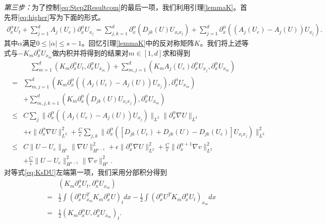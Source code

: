 \documentclass{article}
\begin{document}
\emph{第三步：}为了控制\eqref{eq:Step2Resultcom}的最后一项，我们利用引理\ref{lemmaK}。首先将\eqref{eq:higher}写为下面的形式。
\begin{eqnarray*}
  \partial_x^\alpha  U_t + \sum_{j=1}^d A_j(U_e) \partial_x^\alpha  U_{x_j}
 = \sum_{j,k=1}^d  \partial_x^\alpha ( D_{jk} (U)U_{x_i x_j} ) + \sum_{j=1}^d \partial_x^\alpha ((A_j(U_e) - A_j(U))U_{x_j}).
\end{eqnarray*}
其中$\alpha$满足$0\le|\alpha|\le s-1$。回忆引理\ref{lemmaK}中的反对称矩阵$K$。我们将上述等式与$-K_m\partial_x^\alpha U_{x_m}$做内积并将得到的结果对$m \in [1,d]$求和得到
\begin{eqnarray} \label{eq:KsDU}
  && \quad \sum_{m=1}^d  (K_m \partial_x^\alpha U_t,\partial_x^\alpha U_{x_m}) + \sum_{m,j=1}^d (K_m A_j(U_e) \partial_x^\alpha U_{x_j}, \partial_x^\alpha U_{x_m}) \\
  &=&  \sum_{m,j=1}^d(K_m\partial_x^\alpha ( (A_j(U_e) - A_j(U)) U_{x_j}), \partial_x^\alpha U_{x_m}) \nonumber \\
 && +
  \sum_{m,j,k=1}^d (K_m \partial_x^\alpha (D_{jk} (U) U_{x_i x_j} ),\partial_x^\alpha U_{x_m}) \nonumber \\
 & \le&
  C\sum_j \|\partial_x^\alpha ((A_j(U_e)-A_j(U))U_{x_j})\|_{L^2} \|\partial_x^\alpha \nabla U\|_{L^2} \nonumber \\
  && + \epsilon \|\partial_x^\alpha \nabla U\|_{L^2}^2  + \frac{C}{\epsilon} \sum_{j,k} \| \partial_x^\alpha ([D_{jk} (U_e) + D_{jk} (U) - D_{jk} (U_e)]U_{x_i x_j}) \|_{L^2}^2  \nonumber \\
 &\le& C \|U-U_e\|_{H^s} \|\nabla U\|_{H^{s-1}}^2 + \epsilon \|\partial_x^\alpha \nabla U\|_{L^2}^2 + \frac{C}{\epsilon}  \|\partial_x^{\alpha+1} \nabla  v \|_{L^2}^2  \nonumber \\
&& + \frac{C}{\epsilon}\| U-U_e\|_{H^{s-1}}^2  \|\nabla  v \|_{H^s}^2 . \nonumber
\end{eqnarray}
对等式\eqref{eq:KsDU}左端第一项，我们采用分部积分得到
\begin{eqnarray} \label{eq:L1}
  &&(K_m \partial_x^\alpha U_t,\partial_x^\alpha U_{x_m})  \\
  &=& \frac{1}{2} \int (\partial_x^\alpha U_{x_m}^T K_m \partial_x^\alpha U)_t dx - \frac{1}{2} \int (\partial_x^\alpha U^T K_m \partial_x^\alpha U_t)_{x_m} dx \nonumber \\
  &=& \frac{1}{2} (K_m \partial_x^\alpha U,\partial_x^\alpha U_{x_m})_t. \nonumber
\end{eqnarray}
\end{document}
